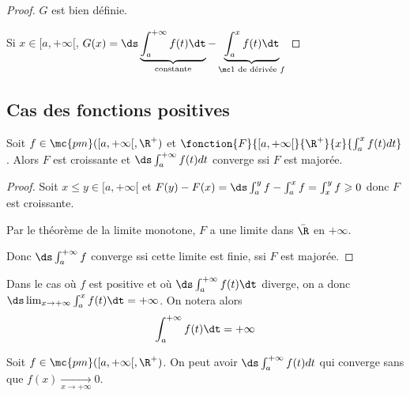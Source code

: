 \begin{proof}
    $G$ est bien définie. 

    Si $x \in [a, + \infty[$, $G(x) = \ds \underbrace{\int_{a}^{+ \infty } f(t) \dt}_{\text{constante}} - \underbrace{\int_a^x f(t) \dt}_{\mc 1 \text{ de dérivée } f}$
\end{proof}

\subsection{Cas des fonctions positives}

\begin{proposition}{}{}
    Soit $f \in \mc{pm}([a, + \infty[, \R^+)$ et $\fonction{F}{[a, + \infty[}{\R^+}{x}{\int_a^x f(t) dt}$.
    Alors $F$ est croissante et $\ds \int_a^{+ \infty} f(t) dt$ converge ssi $F$ est majorée.
\end{proposition}

\begin{proof}
    Soit $x \leqslant y \in [a, +\infty[$ et $F(y) - F(x) = \ds \int_a^y f - \int_a^x f = \int_x^y f \geqslant 0$ donc $F$ est croissante.

    Par le théorème de la limite monotone, $F$ a une limite dans $\bar{\R}$ en $+\infty$.

    Donc $\ds \int_{a }^{+\infty   } f$ converge ssi cette limite est finie, ssi $F$ est majorée.
\end{proof}

\begin{remarque}
    Dans le cas où $f$ est positive et où $\ds \int_{a }^{+ \infty   } f(t) \dt$ diverge, on a 
    donc $\ds \lim_{x \to + \infty   } \int_{a }^{x } f(t) \dt = + \infty$.
    On notera alors 
    $$\int_{a }^{+ \infty   } f(t) \dt = + \infty$$
\end{remarque}



\begin{proposition}{}{}
    Soit $f \in \mc{pm}([a, + \infty[, \R^+)$. On peut avoir $\ds \int_a^{+ \infty} f(t) dt$ 
    qui converge sans que $f(x) \xrightarrow[x \to + \infty   ]{} 0$.
\end{proposition}


